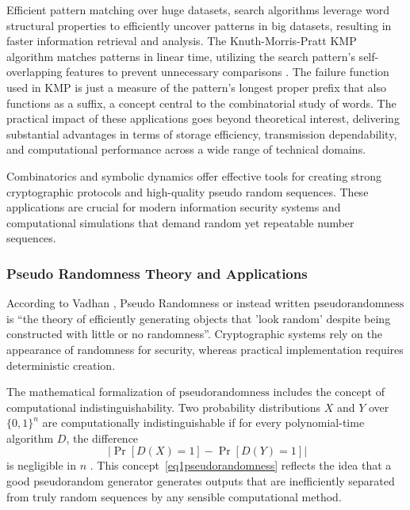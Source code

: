 \documentclass[12pt,a4paper]{article}
\begin{document}
 Efficient pattern matching over huge datasets, search algorithms leverage word structural properties to efficiently uncover patterns in big datasets, resulting in faster information retrieval and analysis.  The Knuth-Morris-Pratt $\mathrm{KMP}$ algorithm matches patterns in linear time, utilizing the search pattern's self-overlapping features to prevent unnecessary comparisons \cite{Knuth}.  The failure function used in $\mathrm{KMP}$ is just a measure of the pattern's longest proper prefix that also functions as a suffix, a concept central to the combinatorial study of words. The practical impact of these applications goes beyond theoretical interest, delivering substantial advantages in terms of storage efficiency, transmission dependability, and computational performance across a wide range of technical domains.

Combinatorics and symbolic dynamics offer effective tools for creating strong cryptographic protocols and high-quality pseudo random sequences.  These applications are crucial for modern information security systems and computational simulations that demand random yet repeatable number sequences.
\subsubsection{Pseudo Randomness Theory and Applications}

According to Vadhan \cite{Vadhan}, Pseudo Randomness or instead written $\mathrm{pseudorandomness}$ is ``the theory of efficiently generating objects that 'look random' despite being constructed with little or no randomness''.   Cryptographic systems rely on the appearance of randomness for security, whereas practical implementation requires deterministic creation.

The mathematical formalization of $\mathrm{pseudorandomness}$ includes the concept of computational indistinguishability.  Two probability distributions $X$ and $Y$ over $\{0,1\}^n$ are computationally indistinguishable if for every polynomial-time algorithm $D$, the difference
\begin{equation}~\label{eq1pseudorandomness}
|\Pr[D(X) = 1] - \Pr[D(Y) = 1]|
\end{equation}
is negligible in $n$ \cite{Goldreich}.  This concept~\eqref{eq1pseudorandomness} reflects the idea that a good pseudorandom generator generates outputs that are inefficiently separated from truly random sequences by any sensible computational method.
\end{document}
